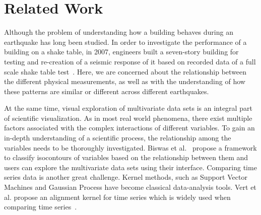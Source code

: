 \section{Related Work}
\label{sec:related}

Although the problem of understanding how a building behaves during an earthquake has long been studied.
In order to investigate the performance of a building on a shake table, in 2007, engineers built a seven-story building for testing and re-creation of a seismic response of it based on recorded data of a full scale shake table test~\cite{Chourasia:2007:DRS:1247238.1247243}. Here, we are concerned about the relationship between the different physical measurements, as well as with the understanding of how these patterns are similar or different across different earthquakes.

At the same time, visual exploration of multivariate data sets is an integral part of scientific visualization. As in most real world phenomena, there exist multiple factors associated with the complex interactions of different variables. To gain an in-depth understanding of a scientific process, the relationship among the variables needs to be thoroughly investigated. Biswas et al.~\cite{Biswas:2013:AIFEMDS:1077-2626} propose a framework to classify isocontours of variables based on the relationship between them and users can explore the multivariate data sets using their interface. Comparing time series data is another great challenge. Kernel methods, such as Support Vector Machines and Gaussian Process have become classical data-analysis tools. Vert et al. propose an alignment kernel for time series which is widely used when comparing time series~\cite{DBLP:journals/corr/abs-cs-0610033}.


